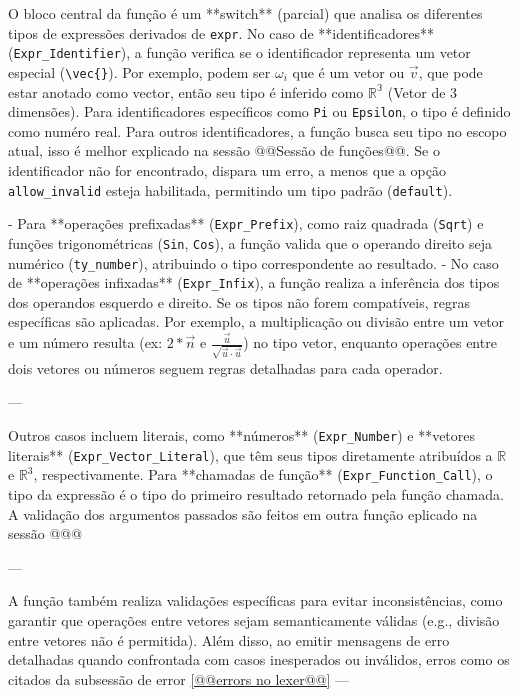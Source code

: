 O bloco central da função é um **switch** (parcial) que analisa os diferentes tipos de expressões derivados de \verb`expr`.  
No caso de **identificadores** (\verb`Expr_Identifier`), a função verifica se o identificador representa um vetor especial (\verb`\vec{}`). Por exemplo, podem ser $\omega_i$ que é um vetor ou $\vec{v}$, que pode estar anotado como vector, então seu tipo é inferido como $\mathbb{R^3}$ (Vetor de 3 dimensões). Para identificadores específicos como \verb`Pi` ou \verb`Epsilon`, o tipo é definido como numéro real. Para outros identificadores, a função busca seu tipo no escopo atual, isso é melhor explicado na sessão @@Sessão de funções@@. Se o identificador não for encontrado, dispara um erro, a menos que a opção \verb`allow_invalid` esteja habilitada, permitindo um tipo padrão (\verb`default`).

- Para **operações prefixadas** (\verb`Expr_Prefix`), como raiz quadrada (\verb`Sqrt`) e funções trigonométricas (\verb`Sin`, \verb`Cos`), a função valida que o operando direito seja numérico (\verb`ty_number`), atribuindo o tipo correspondente ao resultado.  
- No caso de **operações infixadas** (\verb`Expr_Infix`), a função realiza a inferência dos tipos dos operandos esquerdo e direito. Se os tipos não forem compatíveis, regras específicas são aplicadas. Por exemplo, a multiplicação ou divisão entre um vetor e um número resulta (ex: $2*\vec{n}$ e $\frac{\vec{u}}{\sqrt{\vec{u} \cdot \vec{u}}}$) no tipo vetor, enquanto operações entre dois vetores ou números seguem regras detalhadas para cada operador.  

---

Outros casos incluem literais, como **números** (\verb`Expr_Number`) e **vetores literais** (\verb`Expr_Vector_Literal`), que têm seus tipos diretamente atribuídos a $\mathbb{R}$ e $\mathbb{R}^3$, respectivamente. Para **chamadas de função** (\verb`Expr_Function_Call`), o tipo da expressão é o tipo do primeiro resultado retornado pela função chamada. A validação dos argumentos passados são feitos em outra função eplicado na sessão @@@

---

A função também realiza validações específicas para evitar inconsistências, como garantir que operações entre vetores sejam semanticamente válidas (e.g., divisão entre vetores não é permitida). Além disso, ao emitir mensagens de erro detalhadas quando confrontada com casos inesperados ou inválidos, erros como os citados da subsessão de error \autoref{@@errors no lexer@@}
---

